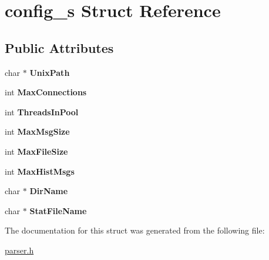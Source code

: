 \hypertarget{structconfig__s}{}\section{config\+\_\+s Struct Reference}
\label{structconfig__s}
\subsection*{Public Attributes}
\begin{DoxyCompactItemize}
\item 
\mbox{\label{structconfig__s_a0cd4128a7e1c25a4735d4f55e5f1ca08}} 
char $\ast$ {\bfseries Unix\+Path}
\item 
\mbox{\label{structconfig__s_a57316191b3c430a9f0242cf14744fe3f}} 
int {\bfseries Max\+Connections}
\item 
\mbox{\label{structconfig__s_ae570dfc9bd511f67f44e2f8a5f9692a4}} 
int {\bfseries Threads\+In\+Pool}
\item 
\mbox{\label{structconfig__s_a6a522c6bd8d4c851fe7a1714f9baba83}} 
int {\bfseries Max\+Msg\+Size}
\item 
\mbox{\label{structconfig__s_a58d5f56cf33d2c86c16ad09f6d97b96a}} 
int {\bfseries Max\+File\+Size}
\item 
\mbox{\label{structconfig__s_a4918ac4b7b476dd5a3c6edbd6404a52b}} 
int {\bfseries Max\+Hist\+Msgs}
\item 
\mbox{\label{structconfig__s_a2cdf18427f853ac237c4131387771716}} 
char $\ast$ {\bfseries Dir\+Name}
\item 
\mbox{\label{structconfig__s_ac8b8d1f02a9cb116cce651cde1444fd8}} 
char $\ast$ {\bfseries Stat\+File\+Name}
\end{DoxyCompactItemize}


The documentation for this struct was generated from the following file\+:\begin{DoxyCompactItemize}
\item 
\hyperlink{parser_8h}{parser.\+h}\end{DoxyCompactItemize}
